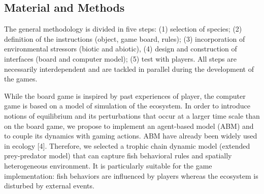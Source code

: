 \subsection{Material and Methods}{}

The general methodology is divided in five steps: (1) selection of species; (2) definition of the instructions (object, game board, rules); (3) incorporation of environmental stressors (biotic and abiotic), (4) design and construction of interfaces (board and computer model); (5) test with players. All steps are necessarily interdependent and are tackled in parallel during the development of the games.

While the board game is inspired by past experiences of player, the computer game is based on a model of simulation of the ecosystem. In order to introduce notions of equilibrium and its perturbations that occur at a larger time scale than on the board game, we propose to implement an agent-based model (ABM) and to couple its dynamics with gaming actions. ABM have already been widely used in ecology [4]. Therefore, we selected a trophic chain dynamic model (extended prey-predator model) that can capture fish behavioral rules and spatially heterogeneous environment. It is particularly suitable for the game implementation: fish behaviors are influenced by players whereas the ecosystem is disturbed by external events. 

